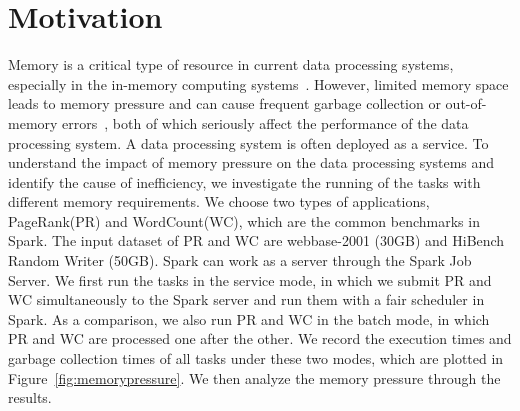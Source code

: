 \section{Motivation}
\label{sec:motivation}

Memory is a critical type of resource in current data processing systems, especially in the in-memory computing systems~\cite{shi:mammoth}. However, limited memory space leads to memory pressure and can cause frequent garbage collection or out-of-memory errors~\cite{fang2015interruptible}, both of which seriously affect the performance of the data processing system. A data processing system is often deployed as a service. To understand the impact of memory pressure on the data processing systems and identify the cause of inefficiency, we investigate the running of the tasks with different memory requirements. We choose two types of applications, PageRank(PR) and WordCount(WC), which are the common benchmarks in Spark. The input dataset of PR and WC are webbase-2001 (30GB) and HiBench Random Writer (50GB). 
Spark can work as a server through the Spark Job Server. We first run the tasks in the service mode, in which we submit PR and WC simultaneously to the Spark server and run them with a fair scheduler in Spark. As a comparison, we also run PR and WC in the batch mode, in which PR and WC are processed one after the other. We record the execution times and garbage collection times of all tasks under these two modes, which are plotted in Figure~\ref{fig:memorypressure}. We then analyze the memory pressure through the results. 


